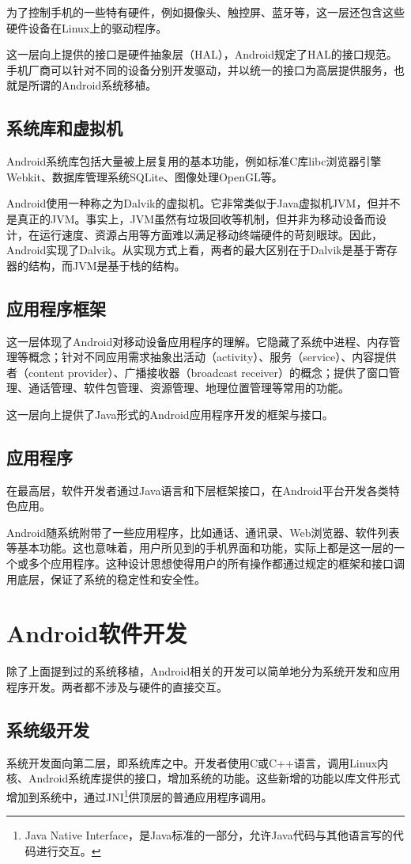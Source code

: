 为了控制手机的一些特有硬件，例如摄像头、触控屏、蓝牙等，这一层还包含这些硬件设备在Linux上的驱动程序。

这一层向上提供的接口是硬件抽象层（HAL），Android规定了HAL的接口规范。手机厂商可以针对不同的设备分别开发驱动，并以统一的接口为高层提供服务，也就是所谓的Android系统移植。

\subsection{系统库和虚拟机}
Android系统库包括大量被上层复用的基本功能，例如标准C库libc浏览器引擎Webkit、数据库管理系统SQLite、图像处理OpenGL等。

Android使用一种称之为Dalvik的虚拟机。它非常类似于Java虚拟机JVM，但并不是真正的JVM。事实上，JVM虽然有垃圾回收等机制，但并非为移动设备而设计，在运行速度、资源占用等方面难以满足移动终端硬件的苛刻眼球。因此，Android实现了Dalvik。从实现方式上看，两者的最大区别在于Dalvik是基于寄存器的结构，而JVM是基于栈的结构。

\subsection{应用程序框架}
这一层体现了Android对移动设备应用程序的理解。它隐藏了系统中进程、内存管理等概念；针对不同应用需求抽象出活动（activity）、服务（service）、内容提供者（content provider）、广播接收器（broadcast receiver）的概念；提供了窗口管理、通话管理、软件包管理、资源管理、地理位置管理等常用的功能。

这一层向上提供了Java形式的Android应用程序开发的框架与接口。

\subsection{应用程序}
在最高层，软件开发者通过Java语言和下层框架接口，在Android平台开发各类特色应用。

Android随系统附带了一些应用程序，比如通话、通讯录、Web浏览器、软件列表等基本功能。这也意味着，用户所见到的手机界面和功能，实际上都是这一层的一个或多个应用程序。这种设计思想使得用户的所有操作都通过规定的框架和接口调用底层，保证了系统的稳定性和安全性。

\section{Android软件开发}
除了上面提到过的系统移植，Android相关的开发可以简单地分为系统开发和应用程序开发。两者都不涉及与硬件的直接交互。

\subsection{系统级开发}
系统开发面向第二层，即系统库之中。开发者使用C或C++语言，调用Linux内核、Android系统库提供的接口，增加系统的功能。这些新增的功能以库文件形式增加到系统中，通过JNI\footnote{Java Native Interface，是Java标准的一部分，允许Java代码与其他语言写的代码进行交互。}供顶层的普通应用程序调用。

